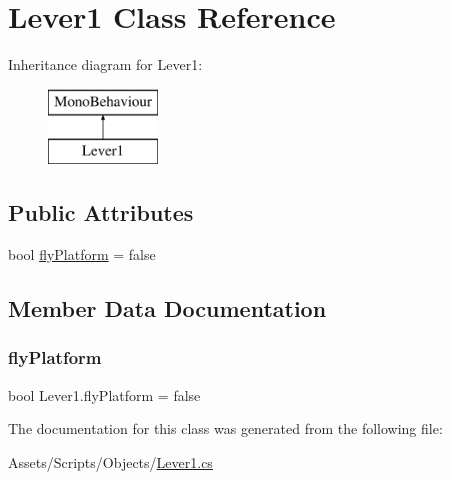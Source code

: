 \hypertarget{class_lever1}{}\section{Lever1 Class Reference}
\label{class_lever1}
Inheritance diagram for Lever1\+:\begin{figure}[H]
\begin{center}
\leavevmode
\includegraphics[height=2.000000cm]{class_lever1}
\end{center}
\end{figure}
\subsection*{Public Attributes}
\begin{DoxyCompactItemize}
\item 
bool \mbox{\hyperlink{class_lever1_abb6ee7bf7584e20bf3d576797a441257}{fly\+Platform}} = false
\end{DoxyCompactItemize}


\subsection{Member Data Documentation}
\mbox{\label{class_lever1_abb6ee7bf7584e20bf3d576797a441257}} 
\subsubsection{\texorpdfstring{fly\+Platform}{flyPlatform}}
{\footnotesize\ttfamily bool Lever1.\+fly\+Platform = false}



The documentation for this class was generated from the following file\+:\begin{DoxyCompactItemize}
\item 
Assets/\+Scripts/\+Objects/\mbox{\hyperlink{_lever1_8cs}{Lever1.\+cs}}\end{DoxyCompactItemize}
